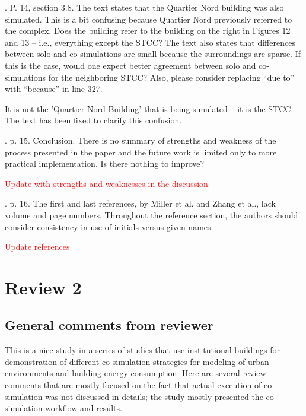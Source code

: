 \documentclass[answers,12pt]{exam}
\begin{document}
\begin{questions}
. P. 14, section 3.8.  The text states that the Quartier Nord building was also simulated. This is a bit confusing because Quartier Nord previously referred to the complex.  Does the building refer to the building on the right in Figures 12 and 13 – i.e., everything except the STCC?  The text also states that differences between solo and co-simulations are small because the surroundings are sparse.  If this is the case, would one expect better agreement between solo and co-simulations for the neighboring STCC?  Also, please consider replacing “due to” with “because” in line 327. 
\begin{solution}
It is not the 'Quartier Nord Building' that is being simulated -- it is the STCC. The text has been fixed to clarify this confusion.
\end{solution}

. p. 15.  Conclusion.  There is no summary of strengths and weakness of the process presented in the paper and the future work is limited only to more practical implementation.  Is there nothing to improve? 
\begin{solution}
\textcolor{red}{Update with strengths and weaknesses in the discussion}
\end{solution}

. p. 16. The first and last references, by Miller et al. and Zhang et al., lack volume and page numbers.  Throughout the reference section, the authors should consider consistency in use of initials versus given names.   
\begin{solution}
\textcolor{red}{Update references}
\end{solution}

\pagebreak
\section{Review 2}

\subsection{General comments from reviewer}
This is a nice study in a series of studies that use institutional buildings for demonstration of different co-simulation strategies for modeling of urban environments and building energy consumption. Here are several review comments that are mostly focused on the fact that actual execution of co-simulation was not discussed in details; the study mostly presented the co-simulation workflow and results. 



\end{questions}
\end{document}

